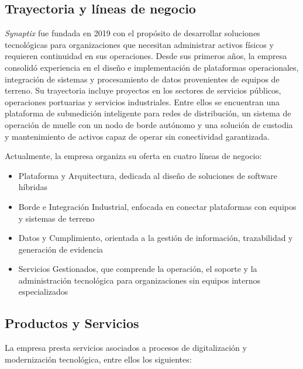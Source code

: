 \subsection{Trayectoria y líneas de negocio}

\textit{Synaptix} fue fundada en 2019 con el propósito de desarrollar soluciones tecnológicas para organizaciones que necesitan administrar activos físicos y requieren continuidad en sus operaciones. Desde sus primeros años, la empresa consolidó experiencia en el diseño e implementación de plataformas operacionales, integración de sistemas y procesamiento de datos provenientes de equipos de terreno.
Su trayectoria incluye proyectos en los sectores de servicios públicos, operaciones portuarias y servicios industriales. Entre ellos se encuentran una plataforma de submedición inteligente para redes de distribución, un sistema de operación de muelle con un nodo de borde autónomo y una solución de custodia y mantenimiento de activos capaz de operar sin conectividad garantizada.



Actualmente, la empresa organiza su oferta en cuatro líneas de negocio:
\begin{itemize}
    \item Plataforma y Arquitectura, dedicada al diseño de soluciones de software híbridas
    \item Borde e Integración Industrial, enfocada en conectar plataformas con equipos y sistemas de terreno
    \item  Datos y Cumplimiento, orientada a la gestión de información, trazabilidad y generación de evidencia
    \item Servicios Gestionados, que comprende la operación, el soporte y la administración tecnológica para organizaciones sin equipos internos especializados
\end{itemize}

\subsection{Productos y Servicios}
La empresa presta servicios asociados a procesos de digitalización y modernización tecnológica, entre ellos los siguientes:

